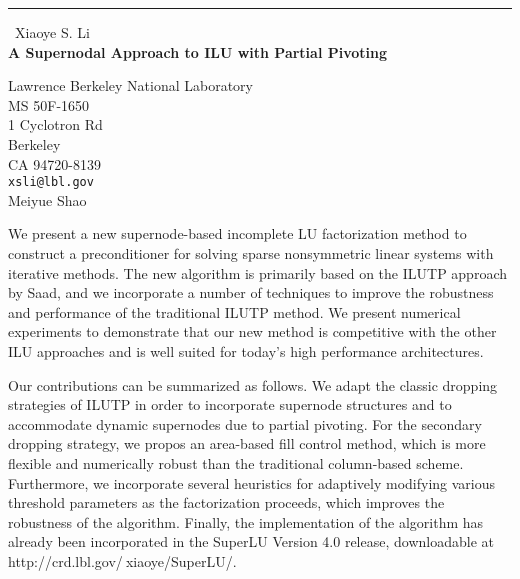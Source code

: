 \documentclass{report}
\begin{document}
\begin{center}
\rule{6in}{1pt} \
{\large Xiaoye S. Li \\
{\bf A Supernodal Approach to ILU with Partial Pivoting}}

Lawrence Berkeley National Laboratory \\ MS 50F-1650 \\ 1 Cyclotron Rd \\ Berkeley \\ CA 94720-8139
\\
{\tt xsli@lbl.gov}\\
Meiyue Shao\end{center}

We present a new supernode-based incomplete LU factorization method
to construct a preconditioner for solving sparse nonsymmetric linear
systems with iterative methods. The new algorithm is primarily based
on the ILUTP approach by Saad, and we incorporate a number of
techniques to improve the robustness and performance of the
traditional ILUTP method. We present numerical experiments to
demonstrate that our new method is competitive with the other ILU
approaches and is well suited for today's high performance architectures.

Our contributions can be summarized as follows. We adapt the classic
dropping strategies of ILUTP in order to incorporate supernode
structures and to accommodate dynamic supernodes due to partial
pivoting. For the secondary dropping strategy, we propos an
area-based fill control method, which is more flexible and numerically
robust than the traditional column-based scheme. Furthermore, we
incorporate several heuristics for adaptively modifying various
threshold parameters as the factorization proceeds, which improves
the robustness of the algorithm. Finally, the implementation of the
algorithm has already been incorporated in the SuperLU Version 4.0
release, downloadable at
http://crd.lbl.gov/$~$xiaoye/SuperLU/.
\end{document}

